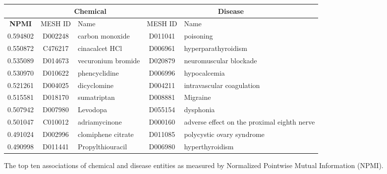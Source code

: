 \documentclass[10pt, oneside]{article}
\begin{document}
\begin{figure}[h]
\begin{center}
\fontsize{9}{11}\selectfont
\begin{tabular}{|*{2}{c|}p{4.5cm}|c|p{4.5cm}|}\hline
 & \multicolumn{2}{c|}{\textbf{Chemical}} & \multicolumn{2}{c|}{\textbf{Disease}} \\ \hline 
 \textbf{NPMI} & MESH ID   & Name                      & MESH ID   & Name                         \\ \hline
 0.594802 & D002248   & carbon monoxide    & D011041   & poisoning                                   \\ \hline
 0.550872 & C476217   & cinacalcet HCl     & D006961   & hyperparathyroidism                         \\ \hline
 0.535089 & D014673   & vecuronium bromide & D020879   & neuromuscular blockade                      \\ \hline
 0.530970 & D010622   & phencyclidine      & D006996   & hypocalcemia                                \\ \hline
 0.521261 & D004025   & dicyclomine        & D004211   & intravascular coagulation                   \\ \hline
 0.515581 & D018170   & sumatriptan        & D008881   & Migraine                                    \\ \hline
 0.507942 & D007980   & Levodopa           & D055154   & dysphonia                                   \\ \hline
 0.501047 & C010012   & adriamycinone      & D000160   & adverse effect on the proximal eighth nerve \\ \hline
 0.491024 & D002996   & clomiphene citrate & D011085   & polycystic ovary syndrome                   \\ \hline
 0.490998 & D011441   & Propylthiouracil   & D006980   & hyperthyroidism                             \\ \hline
\end{tabular}
\caption{\label{fig:npmi} The top ten associations of chemical and disease entities as measured by Normalized Pointwise Mutual Information (NPMI).}
\end{center}
\end{figure}
\end{document}
